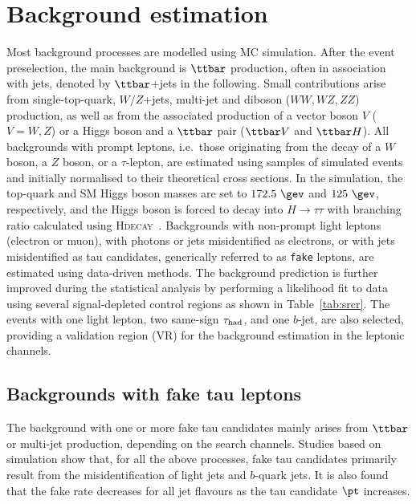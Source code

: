 \section{Background estimation}
\label{sec:background_model}

Most background processes are modelled using MC simulation.
After the event preselection, the main background is $\ttbar$ production, often in association with jets, denoted by $\ttbar$+jets in the following.
Small contributions arise from single-top-quark, $W/Z$+jets, multi-jet and diboson ($WW,WZ,ZZ$) production, as well as from the associated 
production of a vector boson $V$ ($V=W,Z$) or a Higgs boson and a $\ttbar$ pair ($\ttbar V$ and $\ttbar H$). All backgrounds 
with prompt leptons, i.e.\ those originating from the decay of a $W$ boson, a $Z$ boson, or a $\tau$-lepton,
are estimated using samples of simulated events and initially normalised to their theoretical cross sections.
In the simulation, the top-quark and SM Higgs boson masses are set to $172.5~\gev$ and $125~\gev$, respectively,
and the Higgs boson is forced to decay into $H\to \tau\tau$ with branching ratio calculated using \textsc{Hdecay}~\cite{Djouadi:1997yw}.  
Backgrounds with non-prompt light leptons (electron or muon), with photons or jets misidentified as electrons, or with jets misidentified as tau candidates, 
generically referred to as \texttt{fake} leptons, are estimated using data-driven methods. 
The background prediction is further improved during the statistical analysis by performing a likelihood 
fit to data using several signal-depleted control regions as shown in Table~\ref{tab:srcr}.
The events with one light lepton, two same-sign $\tau_{\mathrm{had}}$, and one $b$-jet, are also selected, providing a validation region (VR) for the background estimation in the leptonic channels. 
\subsection{Backgrounds with fake tau leptons}
\label{sec:faketaus}
The background with one or more fake tau candidates mainly arises from $\ttbar$ or
multi-jet production, depending on the search channels.
Studies based on simulation show that, for all the above processes, fake tau candidates primarily result from the
misidentification of light jets and $b$-quark jets.
It is also found that the fake rate decreases for all jet flavours as the tau candidate $\pt$ increases.

